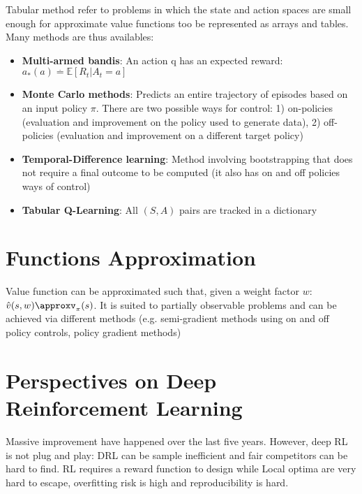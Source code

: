 \documentclass[a4paper]{article}
\begin{document}
Tabular method refer to problems in which the state and action spaces are small enough for approximate value functions too be represented as arrays and tables. Many methods are thus availables:
\begin{itemize}
  \item \textbf{Multi-armed bandis}: An action q has an expected reward: $a_\ast(a)\overset{.}{=}\mathbb{E}[R_t|A_t=a]$
  \item \textbf{Monte Carlo methods}: Predicts an entire trajectory of episodes based on an input policy $\pi$. There are two possible ways for control: 1) on-policies (evaluation and improvement on the policy used to generate data), 2) off-policies (evaluation and improvement on a different target policy)
  \item \textbf{Temporal-Difference learning}: Method involving bootstrapping that does not require a final outcome to be computed (it also has on and off policies ways of control)
  \item \textbf{Tabular Q-Learning}: All $(S, A)$ pairs are tracked in a dictionary
\end{itemize}

\section{Functions Approximation}
Value function can be approximated such that, given a weight factor $w$: $\hat{v}(s, w)\approxv_\pi(s)$. It is suited to partially observable problems and can be achieved via different methods (e.g. semi-gradient methods using on and off policy controls, policy gradient methods)

\section{Perspectives on Deep Reinforcement Learning}

Massive improvement have happened over the last five years. However, deep RL is not plug and play: DRL can be sample inefficient and fair competitors can be hard to find. RL requires a reward function to design while Local optima are very hard to escape, overfitting risk is high and reproducibility is hard.
\end{document}
